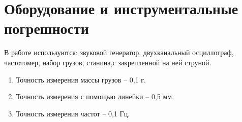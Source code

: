 \section{Оборудование и инструментальные погрешности}
В работе используются: звуковой генератор, двухканальный осциллограф, частотомер, набор грузов, станина,с закрепленной на ней струной.\\

\begin{enumerate}
    \item Точность измерения массы грузов -- 0,1 г.
    \item Точность измерения с помощью линейки -- 0,5 мм.
    \item Точность измерения частот -- 0,1 Гц.
\end{enumerate}
